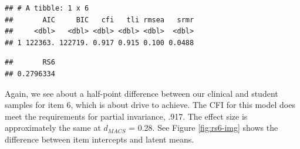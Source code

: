 \documentclass[
  man]{apa7}
\newenvironment{Shaded}{\begin{snugshade}}{\end{snugshade}}
\newcommand{\AttributeTok}[1]{\textcolor[rgb]{0.13,0.29,0.53}{#1}}
\newcommand{\CommentTok}[1]{\textcolor[rgb]{0.56,0.35,0.01}{\textit{#1}}}
\newcommand{\DecValTok}[1]{\textcolor[rgb]{0.00,0.00,0.81}{#1}}
\newcommand{\FloatTok}[1]{\textcolor[rgb]{0.00,0.00,0.81}{#1}}
\newcommand{\FunctionTok}[1]{\textcolor[rgb]{0.13,0.29,0.53}{\textbf{#1}}}
\newcommand{\NormalTok}[1]{#1}
\newcommand{\SpecialCharTok}[1]{\textcolor[rgb]{0.81,0.36,0.00}{\textbf{#1}}}
\newcommand{\StringTok}[1]{\textcolor[rgb]{0.31,0.60,0.02}{#1}}
\begin{document}
\begin{verbatim}
## # A tibble: 1 x 6
##       AIC     BIC   cfi   tli rmsea   srmr
##     <dbl>   <dbl> <dbl> <dbl> <dbl>  <dbl>
## 1 122363. 122719. 0.917 0.915 0.100 0.0488
\end{verbatim}

\small

\begin{Shaded}
\end{Shaded}

\normalsize

\begin{verbatim}
##       RS6 
## 0.2796334
\end{verbatim}

Again, we see about a half-point difference between our clinical and student samples for item 6, which is about drive to achieve. The CFI for this model does meet the requirements for partial invariance, .917. The effect size is approximately the same at \(d_{MACS}\) = 0.28. See Figure \ref{fig:rs6-img} shows the difference between item intercepts and latent means.

\normalsize

\begin{Shaded}
\end{Shaded}
\end{document}
